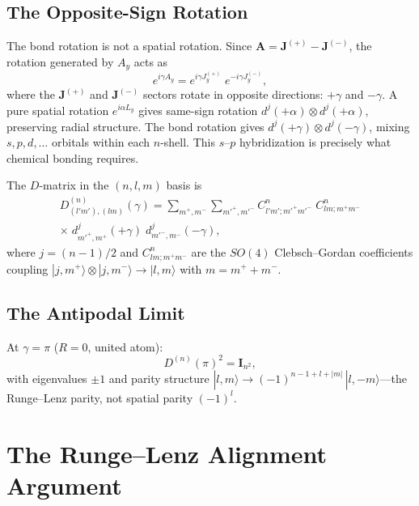 \documentclass[aps,pra,twocolumn,superscriptaddress,longbibliography]{revtex4-2}
\theoremstyle{remark}
\theoremstyle{plain}
\begin{document}
\subsection{The Opposite-Sign Rotation}
\label{sec:opposite_sign}

The bond rotation is not a spatial rotation.  Since
$\mathbf{A} = \mathbf{J}^{(+)} - \mathbf{J}^{(-)}$, the rotation
generated by $A_y$ acts as
\begin{equation}
e^{i\gamma A_y}
= e^{i\gamma J^{(+)}_y}\; e^{-i\gamma J^{(-)}_y},
\label{eq:opposite_sign}
\end{equation}
where the $\mathbf{J}^{(+)}$ and $\mathbf{J}^{(-)}$ sectors rotate in
opposite directions: $+\gamma$ and $-\gamma$.  A pure spatial rotation
$e^{i\alpha L_y}$ gives same-sign rotation $d^j(+\alpha) \otimes
d^j(+\alpha)$, preserving radial structure.  The bond rotation gives
$d^j(+\gamma) \otimes d^j(-\gamma)$, mixing $s, p, d, \ldots$
orbitals within each $n$-shell.  This $s$--$p$ hybridization is
precisely what chemical bonding requires.

The $D$-matrix in the $(n, l, m)$ basis is
\begin{multline}
D^{(n)}_{(l'm'),(lm)}(\gamma)
= \sum_{m^+, m^-} \sum_{m'^+, m'^-}
C^{n}_{l'm'; m'^+m'^-}\; C^{n}_{lm; m^+m^-} \\
\times\; d^{j}_{m'^+, m^+}(+\gamma)\;
d^{j}_{m'^-, m^-}(-\gamma),
\label{eq:D_nlm}
\end{multline}
where $j = (n-1)/2$ and $C^{n}_{lm; m^+m^-}$ are the $SO(4)$
Clebsch--Gordan coefficients coupling
$|j, m^+\rangle \otimes |j, m^-\rangle \to |l, m\rangle$ with
$m = m^+ + m^-$.

\subsection{The Antipodal Limit}

At $\gamma = \pi$ ($R = 0$, united atom):
\begin{equation}
D^{(n)}(\pi)^2 = \mathbf{I}_{n^2},
\label{eq:D_pi_squared}
\end{equation}
with eigenvalues $\pm 1$ and parity structure
$|l, m\rangle \to (-1)^{n-1+l+|m|}\, |l, -m\rangle$---the
Runge--Lenz parity, not spatial parity $(-1)^l$.


\section{The Runge--Lenz Alignment Argument}
\label{sec:runge_lenz}
\end{document}
